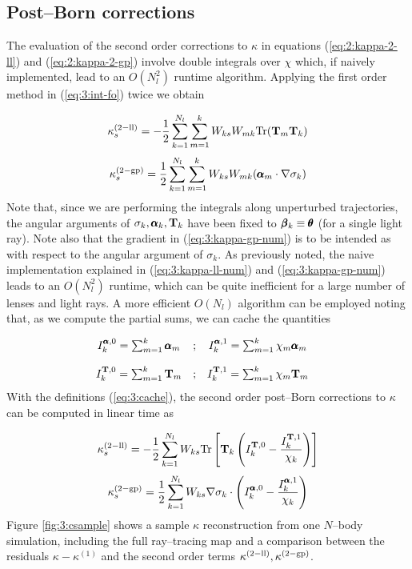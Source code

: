 \subsection{Post--Born corrections}
The evaluation of the second order corrections to $\kappa$ in equations (\ref{eq:2:kappa-2-ll}) and (\ref{eq:2:kappa-2-gp}) involve double integrals over $\chi$ which, if naively implemented, lead to an $O(N_l^2)$ runtime algorithm. Applying the first order method in (\ref{eq:3:int-fo}) twice we obtain

\begin{equation}
\label{eq:3:kappa-ll-num}
\kappa_s^{(2-{\rm ll})} = -\frac{1}{2}\sum_{k=1}^{N_l}\sum_{m=1}^k W_{ks}W_{mk} {\rm Tr}(\mathbf{T}_m\mathbf{T}_k)
\end{equation}
%
\begin{equation}
\label{eq:3:kappa-gp-num}
\kappa_s^{(2-{\rm gp})} = \frac{1}{2}\sum_{k=1}^{N_l}\sum_{m=1}^k W_{ks}W_{mk} (\pmb{\alpha}_m\cdot\nabla\sigma_k)
\end{equation}
%
Note that, since we are performing the integrals along unperturbed trajectories, the angular arguments of $\sigma_k,\pmb{\alpha}_k,\mathbf{T}_k$ have been fixed to $\pmb{\beta}_k\equiv\pmb{\theta}$ (for a single light ray). Note also that the gradient in (\ref{eq:3:kappa-gp-num}) is to be intended as with respect to the angular argument of $\sigma_k$. As previously noted, the naive implementation explained in (\ref{eq:3:kappa-ll-num}) and (\ref{eq:3:kappa-gp-num}) leads to an $O(N_l^2)$ runtime, which can be quite inefficient for a large number of lenses and light rays. A more efficient $O(N_l)$ algorithm can be employed noting that, as we compute the partial sums, we can cache the quantities 

\begin{equation}
\label{eq:3:cache}
\begin{matrix}
I^{\pmb{\alpha},0}_k = \sum_{m=1}^k \pmb{\alpha}_m & ; & I^{\pmb{\alpha},1}_k = \sum_{m=1}^k \chi_m\pmb{\alpha}_m & \\ \\
I^{\mathbf{T},0}_k = \sum_{m=1}^k \mathbf{T}_m & ; & I^{\mathbf{T},1}_k = \sum_{m=1}^k \chi_m\mathbf{T}_m 
\end{matrix} 
\end{equation} 
%
With the definitions (\ref{eq:3:cache}), the second order post--Born corrections to $\kappa$ can be computed in linear time as  

\begin{equation}
\label{eq:3:kappa-ll-num-lin}
\kappa_s^{(2-{\rm ll})} = -\frac{1}{2}\sum_{k=1}^{N_l} W_{ks} {\rm Tr}\left[\mathbf{T}_k\left(I^{\mathbf{T},0}_k-\frac{I^{\mathbf{T},1}_k}{\chi_k}\right)\right]
\end{equation}
%
\begin{equation}
\label{eq:3:kappa-gp-num-lin}
\kappa_s^{(2-{\rm gp})} = \frac{1}{2}\sum_{k=1}^{N_l} W_{ks}\nabla\sigma_k\cdot\left(I^{\pmb{\alpha},0}_k - \frac{I^{\pmb{\alpha},1}_k}{\chi_k}\right)
\end{equation}
%
Figure \ref{fig:3:csample} shows a sample $\kappa$ reconstruction from one $N$--body simulation, including the full ray--tracing map and a comparison between the residuals $\kappa-\kappa^{(1)}$ and the second order terms $\kappa^{(2-{\rm ll})},\kappa^{(2-{\rm gp})}$. 

